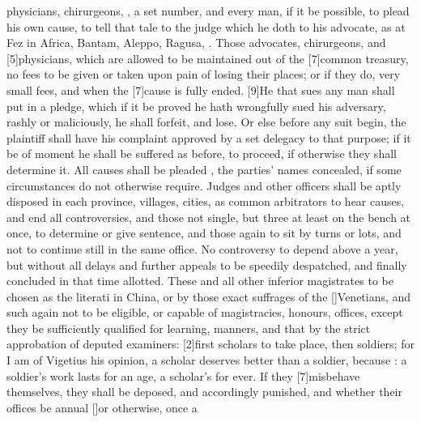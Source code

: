 physicians, chirurgeons, \etc{}, a set number, and every man, if it
be possible, to plead his own cause, to tell that tale to the judge
which he doth to his advocate, as at Fez in Africa, Bantam, Aleppo,
Ragusa, . Those advocates,
chirurgeons, and [5\baselineskip]physicians, which are allowed to be maintained
out of the [7\baselineskip]common treasury, no fees to be given or taken upon pain
of losing their places; or if they do, very small fees, and when the
[7\baselineskip]cause is fully ended. [9\baselineskip]He that sues any man shall put in a
pledge, which if it be proved he hath wrongfully sued his adversary,
rashly or maliciously, he shall forfeit, and lose. Or else before any
suit begin, the plaintiff shall have his complaint approved by a set
delegacy to that purpose; if it be of moment he shall be suffered as
before, to proceed, if otherwise they shall determine it. All causes
shall be pleaded , the parties' names concealed, if
some circumstances do not otherwise require. Judges and other officers
shall be aptly disposed in each province, villages, cities, as common
arbitrators to hear causes, and end all controversies, and those not
single, but three at least on the bench at once, to determine or give
sentence, and those again to sit by turns or lots, and not to continue
still in the same office. No controversy to depend above a year, but
without all delays and further appeals to be speedily despatched, and
finally concluded in that time allotted. These and all other inferior
magistrates to be chosen as the literati in China, or by those
exact suffrages of the [\baselineskip]Venetians, and such again not to be
eligible, or capable of magistracies, honours, offices, except they be
sufficiently qualified for learning, manners, and that by the
strict approbation of deputed examiners: [2\baselineskip]first scholars to take
place, then soldiers; for I am of Vigetius his opinion, a scholar
deserves better than a soldier, because : a
soldier's work lasts for an age, a scholar's for ever. If they
[7\baselineskip]misbehave themselves, they shall be deposed, and accordingly
punished, and whether their offices be annual [\baselineskip]or otherwise, once a
